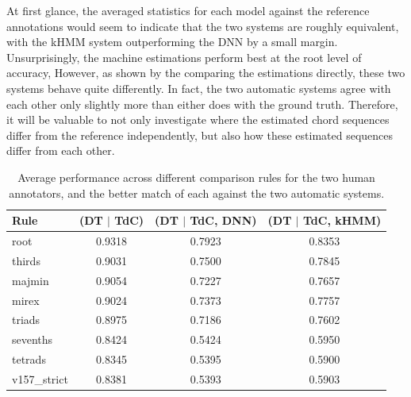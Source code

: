 \documentclass{article}
\begin{document}
At first glance, the averaged statistics for each model against the reference annotations would seem to indicate that the two systems are roughly equivalent, with the kHMM system outperforming the DNN by a small margin.
Unsurprisingly, the machine estimations perform best at the root level of accuracy,
However, as shown by the comparing the estimations directly, these two systems behave quite differently.
In fact, the two automatic systems agree with each other only slightly more than either does with the ground truth.
Therefore, it will be valuable to not only investigate where the estimated chord sequences differ from the reference independently, but also how these estimated sequences differ from each other.

\begin{table}
\scriptsize
\centering
\begin{tabular}{l||c|cc}
Rule      & (DT $|$ TdC) & (DT $|$ TdC, DNN) & (DT $|$ TdC, kHMM) \\
\hline
root        & 0.9318 & 0.7923 & 0.8353 \\
thirds      & 0.9031 & 0.7500 & 0.7845 \\
majmin      & 0.9054 & 0.7227 & 0.7657 \\
mirex       & 0.9024 & 0.7373 & 0.7757 \\
triads      & 0.8975 & 0.7186 & 0.7602 \\
sevenths    & 0.8424 & 0.5424 & 0.5950 \\
tetrads     & 0.8345 & 0.5395 & 0.5900 \\
v157\_strict & 0.8381 & 0.5393 & 0.5903 \\
\hline
\end{tabular}
\caption{Average performance across different comparison rules for the two human annotators, and the better match of each against the two automatic systems.}
\label{tab:rc_performance}
\end{table}
\end{document}
